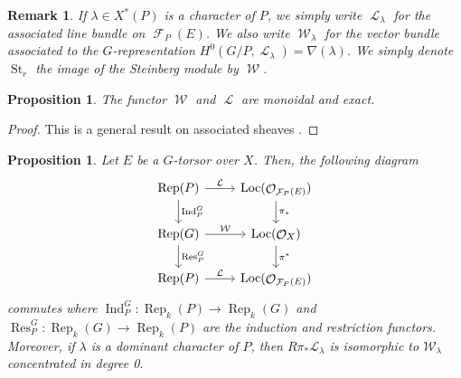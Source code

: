 \documentclass[11pt]{amsart}
\numberwithin{subsection}{section}
\numberwithin{figure}{section}
\numberwithin{table}{section}
\theoremstyle{1}
\newtheorem{proposition}[theorem]{Proposition}
\theoremstyle{2}
\newtheorem{rmrk}[theorem]{Remark}
\DeclareMathOperator{\Rep}{Rep}
\DeclareMathOperator{\Ind}{Ind}
\DeclareMathOperator{\Res}{Res}
\DeclareMathOperator{\St}{St}
\DeclareMathOperator{\Lc}{\mathcal{L}}
\DeclareMathOperator{\Fc}{\mathcal{F}}
\DeclareMathOperator{\Oc}{\mathcal{O}}
\DeclareMathOperator{\W}{\mathcal{W}}
\DeclareMathOperator{\Loc}{Loc}
\begin{document}
\begin{rmrk}
If $\lambda \in X^*(P)$ is a character of $P$, we simply write $\Lc_{\lambda}$ for the associated line bundle on $\Fc_P(E)$. We also write $\W_{\lambda}$ for the vector bundle associated to the $G$-representation $H^0(G/P,\Lc_{\lambda}) = \nabla(\lambda)$. We simply denote $\St_r$ the image of the Steinberg module by $\W$.
\end{rmrk}
\begin{proposition}
The functor $\W$ and $\Lc$ are monoidal and exact.
\end{proposition}
\begin{proof}
This is a general result on associated sheaves \cite[Part.\ 1, Chap. \ 5]{MR2015057}.
\end{proof}

\begin{proposition}\label{prop5}
Let $E$ be a $G$-torsor over $X$. Then, the following diagram
\begin{equation*}
\begin{tikzcd}
\Rep(P) \arrow[r,"\Lc"] \arrow[d,"\Ind_P^G"] & \Loc(\Oc_{\Fc_P(E)}) \arrow[d,"\pi_*"] \\
\Rep(G) \arrow[r,"\W"] \arrow[d,"\Res^G_P"] & \Loc(\Oc_X) \arrow[d,"\pi^*"] \\
\Rep(P) \arrow[r,"\Lc"] & \Loc(\Oc_{\Fc_P(E)}) 
\end{tikzcd}
\end{equation*}
commutes where $\Ind_P^G : \Rep_k(P) \rightarrow \Rep_k(G)$ and $\Res^G_P : \Rep_k(G) \rightarrow \Rep_k(P)$ are the induction and restriction functors. Moreover, if $\lambda$ is a dominant character of $P$, then $R\pi_*\mathcal{L}_{\lambda}$ is isomorphic to $\mathcal{W}_{\lambda}$ concentrated in degree 0. 
\end{proposition}
\end{document}
